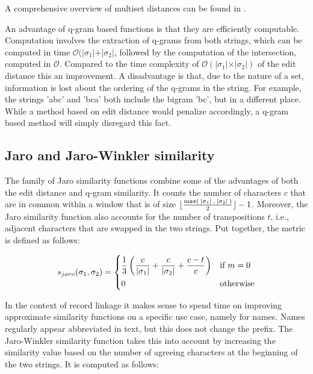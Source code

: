 \noindent A comprehensive overview of multiset distances can be found in \citep{Kosters2008}.

An advantage of q-gram based functions is that they are efficiently computable.
Computation involves the extraction of q-grams from both strings, which can be computed in time $\mathcal{O}(\vert \sigma_1 \vert + \vert \sigma_2 \vert$, followed by the computation of the intersection, computed in $\mathcal{O}$.
Compared to the time complexity of $\mathcal{O}(\vert \sigma_1 \vert \times \vert \sigma_2 \vert)$ of the edit distance this an improvement.
A disadvantage is that, due to the nature of a set, information is lost about the ordering of the q-grams in the string.
For example, the strings 'abc' and 'bca' both include the bigram 'bc', but in a different place.
While a method based on edit distance would penalize accordingly, a q-gram based method will simply disregard this fact.




\subsection{Jaro and Jaro-Winkler similarity}
\label{subsec:jaro}

The family of Jaro similarity functions combine some of the advantages of both the edit distance and q-gram similarity.
It counts the number of characters $c$ that are in common within a window that is of size $\lfloor \frac{\text{max}(\:\vert {\sigma_1} \vert\:, \:\vert {\sigma_2} \vert\:)}{2}\rfloor-1$.
Moreover, the Jaro similarity function also accounts for the number of transpositions $t$, i.e., adjacent characters that are swapped in the two strings.
Put together, the metric is defined as follows:

\begin{equation}
    s_{jaro}(\sigma_1, \sigma_2) =
    \begin{dcases}
        \frac{1}{3} \left( \frac{c}{\vert \sigma_1 \vert} + \frac{c}{\vert \sigma_2 \vert} + \frac{c-t}{c} \right) & \text{if } m = 0 \\
        0 & \text{otherwise}
    \end{dcases}
\end{equation}

In the context of record linkage it makes sense to spend time on improving approximate similarity functions on a specific use case, namely for names.
Names regularly appear abbreviated in text, but this does not change the prefix.
The Jaro-Winkler similarity function takes this into account by increasing the similarity value based on the number of agreeing characters at the beginning of the two strings.
It is computed as follows:

